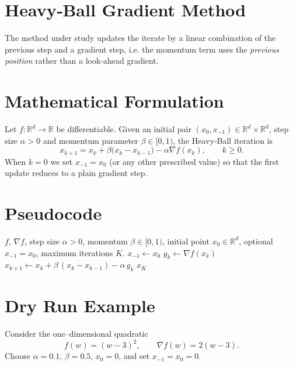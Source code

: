 \documentclass{article}
\begin{document}
\section*{Heavy‑Ball Gradient Method}
The method under study updates the iterate by a linear combination of the
previous step and a gradient step, i.e. the momentum term uses the \emph{previous
position} rather than a look‑ahead gradient.

\section*{Mathematical Formulation}
Let $f:\mathbb{R}^{d}\rightarrow\mathbb{R}$ be differentiable.  
Given an initial pair $(x_{0},x_{-1})\in\mathbb{R}^{d}\times\mathbb{R}^{d}$,
step size $\alpha>0$ and momentum parameter $\beta\in[0,1)$, the Heavy‑Ball
iteration is
\begin{equation}
\boxed{
x_{k+1}=x_{k}+\beta\bigl(x_{k}-x_{k-1}\bigr)-\alpha\nabla f(x_{k}),\qquad k\ge 0 .
}
\label{HB}
\end{equation}
When $k=0$ we set $x_{-1}=x_{0}$ (or any other prescribed value) so that the
first update reduces to a plain gradient step.

\section*{Pseudocode}
\begin{algorithm}[H]
\caption{Heavy‑Ball Gradient Method}
\begin{algorithmic}[1]
\Require $f$, $\nabla f$, step size $\alpha>0$, momentum $\beta\in[0,1)$,
initial point $x_{0}\in\mathbb{R}^{d}$, optional $x_{-1}=x_{0}$,
maximum iterations $K$.
\State $x_{-1}\gets x_{0}$ 
    \State $g_{k}\gets \nabla f(x_{k})$
    \State $x_{k+1}\gets x_{k}+\beta\,(x_{k}-x_{k-1})-\alpha\,g_{k}$
\EndFor
\State \Return $x_{K}$
\end{algorithmic}
\end{algorithm}

\section*{Dry Run Example}
Consider the one–dimensional quadratic
\[
f(w)=(w-3)^{2},\qquad \nabla f(w)=2(w-3).
\]
Choose $\alpha=0.1$, $\beta=0.5$, $x_{0}=0$, and set $x_{-1}=x_{0}=0$.
\end{document}
